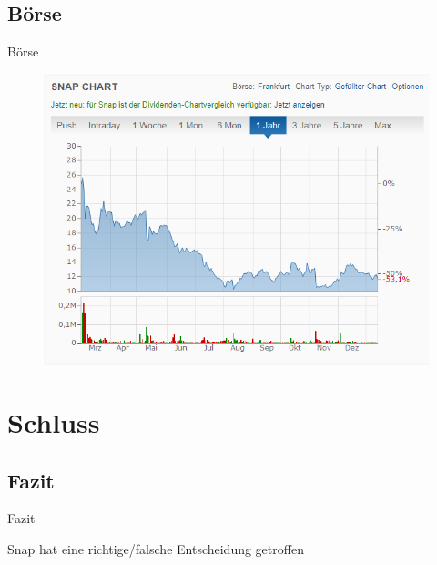 \documentclass{beamer}
\begin{document}
\subsection{Börse}
\begin{frame}{Börse}
\begin{figure}
	\includegraphics[width=0.7\linewidth]{SnapAktie.png}
\end{figure}
\end{frame}


\section{Schluss}
\subsection{Fazit}
\begin{frame}{Fazit}

Snap hat eine richtige/falsche Entscheidung getroffen

\end{frame}
\end{document}
